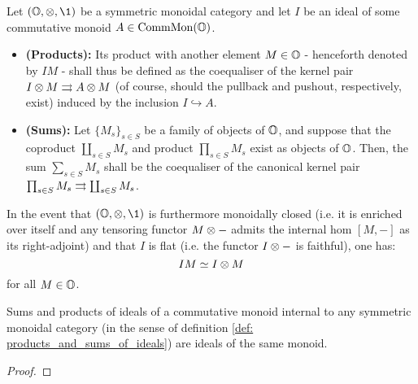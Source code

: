             \begin{definition} \label{def: products_and_sums_of_ideals}
                Let $(\O, \tensor, \1)$ be a symmetric monoidal category and let $I$ be an ideal of some commutative monoid $A \in \mathrm{Comm}\mathrm{Mon}(\mathbb{O})$. 
                    \begin{itemize}
                        \item \textbf{(Products):} Its product with another element $M \in \mathbb{O}$ - henceforth denoted by $IM$ - shall thus be defined as the coequaliser of the kernel pair $I \tensor M \toto A \tensor M$ (of course, should the pullback and pushout, respectively, exist) induced by the inclusion $I \hookrightarrow A$.
                        \item \textbf{(Sums):} Let $\{M_s\}_{s \in S}$ be a family of objects of $\mathbb{O}$, and suppose that the coproduct $\coprod_{s \in S} M_s$ and product $\prod_{s \in S} M_s$ exist as objects of $\mathbb{O}$. Then, the sum $\sum_{s \in S} M_s$ shall be the coequaliser of the canonical kernel pair $\prod_{s \in S} M_s \rightrightarrows \coprod_{s \in S} M_s$.  
                    \end{itemize}
            \end{definition}
            \begin{remark}
                In the event that $(\O, \tensor, \1)$ is furthermore monoidally closed (i.e. it is enriched over itself and any tensoring functor $M \tensor -$ admits the internal hom $[M,- ]$ as its right-adjoint) and that $I$ is flat (i.e. the functor $I \tensor -$ is faithful), one has:
                    $$IM \cong I \tensor M$$
                for all $M \in \mathbb{O}$.
            \end{remark}
            
            \begin{proposition} \label{prop: products_and_sums_of_ideals_are_ideals}
                Sums and products of ideals of a commutative monoid internal to any symmetric monoidal category (in the sense of definition \ref{def: products_and_sums_of_ideals}) are ideals of the same monoid.
            \end{proposition}
                \begin{proof}
                                
                \end{proof}
            
